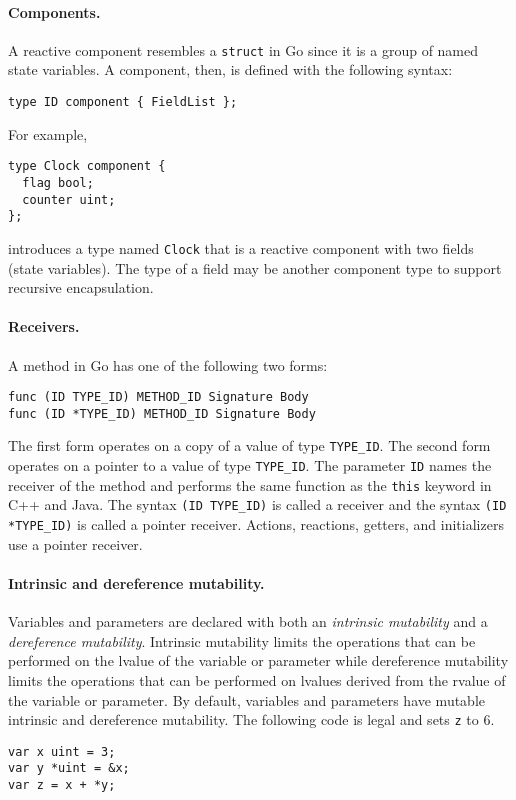 \paragraph{Components.}
A reactive component resembles a \verb+struct+ in Go since it is a group of named state variables.
A component, then, is defined with the following syntax:
\begin{verbatim}
type ID component { FieldList };
\end{verbatim}
For example,
\begin{verbatim}
type Clock component {
  flag bool;
  counter uint;
};
\end{verbatim}
introduces a type named \verb+Clock+ that is a reactive component with two fields (state variables).
The type of a field may be another component type to support recursive encapsulation.

\paragraph{Receivers.}
A method in Go has one of the following two forms:
\begin{verbatim}
func (ID TYPE_ID) METHOD_ID Signature Body
func (ID *TYPE_ID) METHOD_ID Signature Body
\end{verbatim}
The first form operates on a copy of a value of type \verb+TYPE_ID+.
The second form operates on a pointer to a value of type \verb+TYPE_ID+.
The parameter \verb+ID+ names the receiver of the method and performs the same function as the \verb+this+ keyword in C++ and Java.
The syntax \verb+(ID TYPE_ID)+ is called a receiver and the syntax \verb+(ID *TYPE_ID)+ is called a pointer receiver.
Actions, reactions, getters, and initializers use a pointer receiver.

\paragraph{Intrinsic and dereference mutability.}
Variables and parameters are declared with both an \emph{intrinsic mutability} and a \emph{dereference mutability}.
Intrinsic mutability limits the operations that can be performed on the lvalue of the variable or parameter while dereference mutability limits the operations that can be performed on lvalues derived from the rvalue of the variable or parameter.
By default, variables and parameters have mutable intrinsic and dereference mutability.
The following code is legal and sets \verb+z+ to 6.
\begin{verbatim}
var x uint = 3;
var y *uint = &x;
var z = x + *y;
\end{verbatim}


